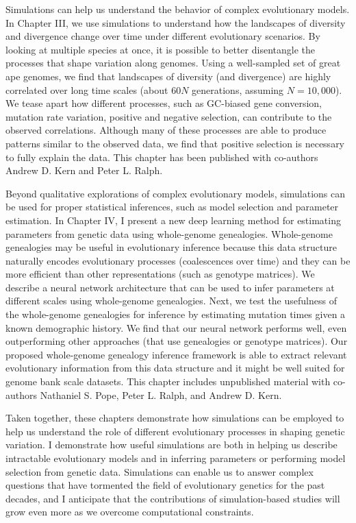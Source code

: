 Simulations can help us understand the behavior of complex evolutionary models.
In Chapter III, we use simulations to understand how the landscapes of diversity and divergence change over time under different evolutionary scenarios.
By looking at multiple species at once, it is possible to better disentangle the processes that shape variation along genomes.
Using a well-sampled set of great ape genomes, we find that landscapes of diversity (and divergence) are highly correlated over long time scales (about $60N$ generations, assuming $N=10,000$).
We tease apart how different processes, such as GC-biased gene conversion, mutation rate variation, positive and negative selection, can contribute to the observed correlations.
Although many of these processes are able to produce patterns similar to the observed data,
we find that positive selection is necessary to fully explain the data.
This chapter has been published with co-authors Andrew D. Kern and Peter L. Ralph.

Beyond qualitative explorations of complex evolutionary models,
simulations can be used for proper statistical inferences, such as model selection and parameter estimation.
In Chapter IV, I present a new deep learning method for estimating parameters from genetic data using whole-genome genealogies.
Whole-genome genealogies may be useful in evolutionary inference because this data structure naturally encodes evolutionary processes (\eg coalescences over time) and they can be more efficient than other representations (such as genotype matrices).
We describe a neural network architecture that can be used to infer parameters at different scales using whole-genome genealogies.
Next, we test the usefulness of the whole-genome genealogies for inference by estimating mutation times given a known demographic history.
We find that our neural network performs well, even outperforming other approaches (that use genealogies or genotype matrices).
Our proposed whole-genome genealogy inference framework is able to extract relevant evolutionary information from this data structure and it might be well suited for genome bank scale datasets.
This chapter includes unpublished material with co-authors Nathaniel S. Pope, Peter L. Ralph, and Andrew D. Kern.

Taken together, these chapters demonstrate how simulations can be employed to help us understand the role of different evolutionary processes in shaping genetic variation.
I demonstrate how useful simulations are both in helping us describe intractable evolutionary models and in inferring parameters or performing model selection from genetic data.
Simulations can enable us to answer complex questions that have tormented the field of evolutionary genetics for the past decades, 
and I anticipate that the contributions of simulation-based studies will grow even more as we overcome computational constraints.
